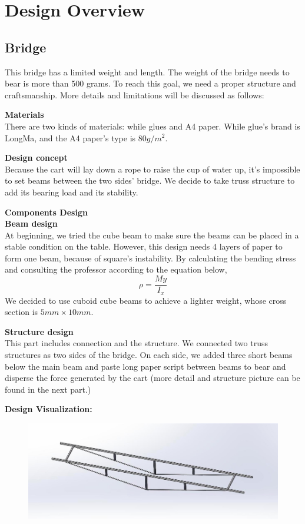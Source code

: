 \section{Design Overview}
\subsection{Bridge}
This bridge has a limited weight and length. The weight of the bridge needs to
bear is more than 500 grams. To reach this goal, we need a proper structure and
craftsmanship. More details and limitations will be discussed as follows: 

\medskip
\noindent
\textbf{Materials} \\
\indent
There are two kinds of materials: while glues and A4 paper.
While glue's brand is LongMa, and the A4 paper’s type is 80$g/m^2$.

\medskip
\noindent
\textbf{Design concept} \\
\indent
Because the cart will lay down a rope to raise the cup of water up, it’s
impossible to set beams between the two sides’ bridge. We decide to take truss
structure to add its bearing load and its stability.

 
\medskip
\noindent
{\large\textbf{Components Design}} \\
\textbf{Beam design} \\
\indent
At beginning, we tried the cube beam to make sure the beams can be placed in a
stable condition on the table. However, this design needs 4 layers of paper to
form one beam, because of square’s instability. By calculating the bending
stress and consulting the professor according to the equation below,
$$  \rho = \frac{My}{I_{x}}  $$
We decided to use cuboid cube beams to
achieve a lighter weight, whose cross section is $5mm\times10mm$. 


\medskip
\noindent
\textbf{Structure design} \\
\indent
This part includes connection and the structure. We connected two truss
structures as two sides of the bridge. On each side, we added three short beams
below the main beam and paste long paper script between beams to bear and
disperse the force generated by the cart (more detail and structure picture can
be found in the next part.) 

\medskip
\noindent
\textbf{Design Visualization:} \\
\indent

\begin{figure}[H]
\begin{center}
\includegraphics[width=15cm]{figure/designOverview/p3}
\end{center}
\end{figure}


